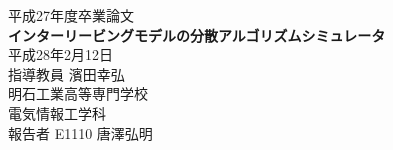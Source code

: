 
\begin{titlepage}
	\centering
	\vspace*{3.5cm}
	{\huge 平成27年度卒業論文}
	\vspace{1.5cm} \\
	{\huge \textbf{インターリービングモデルの分散アルゴリズムシミュレータ}}
	\vspace{5cm} \\
	{\LARGE 平成28年2月12日}
	\vspace{1.0cm} \\
	{\LARGE 指導教員  濱田幸弘}
	\vspace{3.5cm} \\
	{\LARGE 明石工業高等専門学校}
	\vspace{1.0cm} \\
	{\LARGE 電気情報工学科}
	\vspace{1.0cm} \\
	{\LARGE 報告者  E1110 唐澤弘明}
\end{titlepage}
